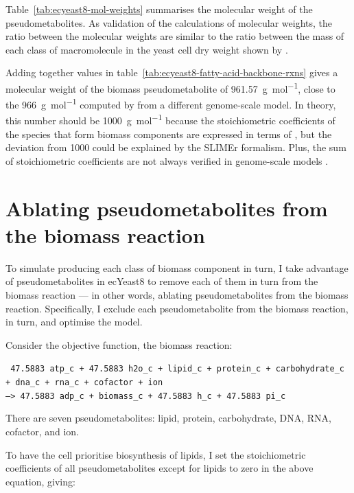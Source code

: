 Table~\ref{tab:ecyeast8-mol-weights} summarises the molecular weight of the pseudometabolites.
As validation of the calculations of molecular weights, the ratio between the molecular weights are similar to the ratio between the mass of each class of macromolecule in the yeast cell dry weight shown by \textcite{canelasVivoDatadrivenFramework2011}.

Adding together values in table~\ref{tab:ecyeast8-fatty-acid-backbone-rxns} gives a  molecular weight of the biomass pseudometabolite of \SI{961.57}{\gram~\mol^{-1}}, close to the \SI{966}{\gram~\mol^{-1}} computed by \textcite{takhaveevTemporalSegregationBiosynthetic2023} from a different genome-scale model.
In theory, this number should be \SI{1000}{\gram~\mol^{-1}} because the stoichiometric coefficients of the species that form biomass components are expressed in terms of \SI{}{\mmolgdw} \parencite{thieleProtocolGeneratingHighquality2010, palssonSystemsBiologyConstraintbased2015}, but the deviation from 1000 could be explained by the SLIMEr formalism.
Plus, the sum of stoichiometric coefficients are not always verified in genome-scale models \parencite{chanStandardizingBiomassReactions2017}.


\section{Ablating pseudometabolites from the biomass reaction}
\label{sec:model-yeast8-pseudometabolites}

To simulate producing each class of biomass component in turn,
I take advantage of pseudometabolites in ecYeast8 to remove each of them in turn from the biomass reaction ---
in other words, ablating pseudometabolites from the biomass reaction.
Specifically, I exclude each pseudometabolite from the biomass reaction, in turn, and optimise the model.

Consider the objective function, the biomass reaction:

\texttt{
  47.5883 atp\_c + 47.5883 h2o\_c + lipid\_c + protein\_c + carbohydrate\_c\\
  + dna\_c + rna\_c + cofactor + ion \\
  --> 47.5883 adp\_c + biomass\_c + 47.5883 h\_c + 47.5883 pi\_c
}

There are seven pseudometabolites: lipid, protein, carbohydrate, DNA, RNA, cofactor, and ion.

To have the cell prioritise biosynthesis of lipids, I set the stoichiometric coefficients of all pseudometabolites except for lipids to zero in the above equation, giving:

